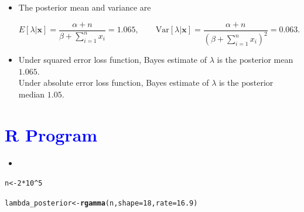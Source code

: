 \documentclass[11pt, a4paper]{article}\usepackage[]{graphicx}\usepackage[]{xcolor}
\makeatletter
\newcommand{\hlnum}[1]{\textcolor[rgb]{0.686,0.059,0.569}{#1}}%
\newcommand{\hlopt}[1]{\textcolor[rgb]{0,0,0}{#1}}%
\newcommand{\hldef}[1]{\textcolor[rgb]{0.345,0.345,0.345}{#1}}%
\newcommand{\hlkwb}[1]{\textcolor[rgb]{0.69,0.353,0.396}{#1}}%
\newcommand{\hlkwc}[1]{\textcolor[rgb]{0.333,0.667,0.333}{#1}}%
\newcommand{\hlkwd}[1]{\textcolor[rgb]{0.737,0.353,0.396}{\textbf{#1}}}%
\newenvironment{kframe}{%
 \def\at@end@of@kframe{}%
 \ifinner\ifhmode%
  \def\at@end@of@kframe{\end{minipage}}%
  \begin{minipage}{\columnwidth}%
 \fi\fi%
 \def\FrameCommand##1{\hskip\@totalleftmargin \hskip-\fboxsep
 \colorbox{shadecolor}{##1}\hskip-\fboxsep
     \hskip-\linewidth \hskip-\@totalleftmargin \hskip\columnwidth}%
 \MakeFramed {\advance\hsize-\width
   \@totalleftmargin\z@ \linewidth\hsize
   \@setminipage}}%
 {\par\unskip\endMakeFramed%
 \at@end@of@kframe}
\newenvironment{knitrout}{}{} %
\makeatother
\begin{document}
\begin{itemize}
From the given, $\lambda | \mathbf{x} \sim \text{Gamma}(18, 16.9)$.

\item[\scalebox{2.0}{\twemoji{keycap: 2}}] \hspace{0.1cm} The posterior mean and variance are

$$E[\lambda | \mathbf{x}] = \dfrac{\alpha + n}{\beta + \sum \limits_{i = 1}^{n} x_i} = 1.065, \qquad \text{Var}[\lambda | \mathbf{x}] = \dfrac{\alpha + n}{ \left( \beta + \sum \limits_{i = 1}^{n} x_i \right)^2} = 0.063.$$

\item[\scalebox{2.0}{\twemoji{keycap: 3}}] \hspace{0.1cm} Under squared error loss function, Bayes estimate of $\lambda$ is the posterior mean $1.065$.\\[0.3em]

Under absolute error loss function, Bayes estimate of $\lambda$ is the posterior median $1.05$.

\end{itemize}

\section*{\faArrowAltCircleRight[regular] \textcolor{blue}{R Program}}





\begin{itemize}
\item[\scalebox{2.0}{\twemoji{keycap: 4}}]
\end{itemize}

\begin{knitrout}
\color{fgcolor}\begin{kframe}
\begin{alltt}
\hldef{n} \hlkwb{<-} \hlnum{2} \hlopt{*} \hlnum{10}\hlopt{^}\hlnum{5}
\end{alltt}
\end{kframe}
\end{knitrout}

\begin{knitrout}
\color{fgcolor}\begin{kframe}
\begin{alltt}
\hldef{lambda_posterior} \hlkwb{<-} \hlkwd{rgamma}\hldef{(n,} \hlkwc{shape} \hldef{=} \hlnum{18}\hldef{,} \hlkwc{rate} \hldef{=} \hlnum{16.9}\hldef{)}
\end{alltt}
\end{kframe}
\end{knitrout}
\end{document}

